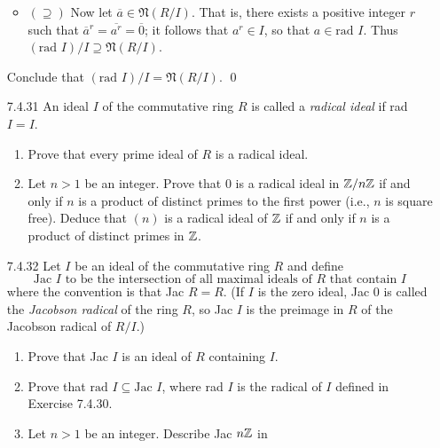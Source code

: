 \begin{enumerate}
\begin{itemize}
         \item $(\supseteq)$ Now let $\overline{a} \in \mathfrak{N}(R/I)$. That 
               is, there exists a positive integer $r$ such that
               $\overline{a}^r = \overline{a^r} = \overline{0}$; it follows that
               $a^r \in I$, so that $a \in \text{rad }I$. Thus
                $(\text{rad } I)/I \supseteq \mathfrak{N}(R/I)$.
      \end{itemize}
      Conclude that  $(\text{rad } I)/I = \mathfrak{N}(R/I)$. \qed
   \item[7.4.31]  An ideal $I$ of the commutative ring $R$ is called a
                  \textit{radical ideal} if rad $I = I$.
                  \begin{enumerate}
                     \item Prove that every prime ideal of $R$ is a radical
                           ideal.
                     \item Let $n > 1$ be an integer. Prove that 0 is a radical
                           ideal in $\mathbb{Z}/n\mathbb{Z}$ if and only if $n$ is a product of
                           distinct primes to the first power (i.e., $n$ is
                           square free). Deduce that $(n)$ is a radical ideal of
                           $\mathbb{Z}$ if and only if $n$ is a product of distinct
                           primes in $\mathbb{Z}$.
                  \end{enumerate}
   \item[7.4.32]  Let $I$ be an ideal of the commutative ring $R$ and define
                  $$\text{Jac $I$ to be the intersection of all maximal ideals
                     of $R$ that contain $I$}$$
                  where the convention is that Jac $R = R$. (If $I$ is the zero
                  ideal, Jac 0 is called the \textit{Jacobson radical} of the
                  ring $R$, so Jac $I$ is the preimage in $R$ of the Jacobson
                  radical of $R/I$.)
                  \begin{enumerate}
                     \item Prove that Jac $I$ is an ideal of $R$ containing $I$.
                     \item Prove that $\text{rad } I \subseteq \text{Jac }I$,
                           where rad $I$ is the radical of $I$ defined in
                           Exercise 7.4.30.
                     \item Let $n > 1$ be an integer. Describe Jac $n\mathbb{Z}$ in

\end{enumerate}
\end{enumerate}

